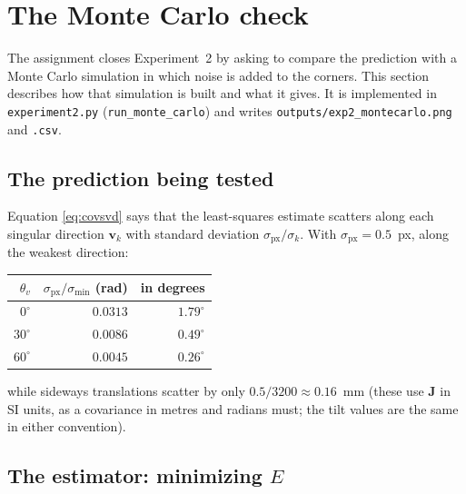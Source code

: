 \documentclass[11pt,a4paper]{article}
\theoremstyle{remark}
\newcommand{\Jmat}{\mathbf{J}}
\newcommand{\vvec}{\mathbf{v}}
\begin{document}
\section{The Monte Carlo check}
\label{sec:mc}

The assignment closes Experiment~2 by asking to compare the prediction with a
Monte Carlo simulation in which noise is added to the corners. This section
describes how that simulation is built and what it gives. It is implemented in
\texttt{experiment2.py} (\texttt{run\_monte\_carlo}) and writes
\texttt{outputs/exp2\_montecarlo.png} and \texttt{.csv}.

\subsection{The prediction being tested}

Equation \eqref{eq:covsvd} says that the least-squares estimate scatters along
each singular direction $\vvec_k$ with standard deviation
$\sigma_{\mathrm{px}}/\sigma_k$. With $\sigma_{\mathrm{px}} = 0.5$~px, along the
weakest direction:
\begin{center}
\begin{tabular}{@{}rrr@{}}
\toprule
$\theta_v$ & $\sigma_{\mathrm{px}}/\sigma_{\min}$ (rad) & in degrees \\
\midrule
$0^{\circ}$  & $0.0313$ & $1.79^{\circ}$ \\
$30^{\circ}$ & $0.0086$ & $0.49^{\circ}$ \\
$60^{\circ}$ & $0.0045$ & $0.26^{\circ}$ \\
\bottomrule
\end{tabular}
\end{center}
while sideways translations scatter by only $0.5/3200 \approx 0.16$~mm (these
use $\Jmat$ in SI units, as a covariance in metres and radians must; the tilt
values are the same in either convention).

\subsection{The estimator: minimizing $E$}
\end{document}
